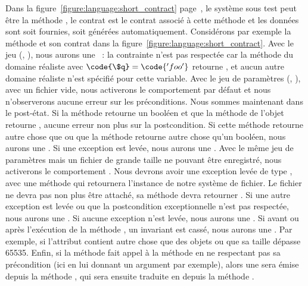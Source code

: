 \begin{example}

Dans la figure~\ref{figure:language:short_contract}
page~\pageref{figure:language:short_contract}, le système sous test peut être la
méthode , le contrat est le contrat associé à cette méthode et les
données sont soit fournies, soit générées automatiquement.  Considérons par
exemple la méthode  et son contrat dans la
figure~\ref{figure:language:short_contract}.
%
Avec le jeu (, ), nous aurons une ~: la contrainte  n'est pas respectée car la
méthode  du domaine réaliste  avec $\code{\$q}
= \code{'foo'}$ retourne , et aucun autre domaine réaliste n'est
spécifié pour cette variable.
%
Avec le jeu de paramètres (, ), avec un fichier
vide, nous activerons le comportement par défaut et nous n'observerons aucune
erreur sur les préconditions. Nous sommes maintenant dans le post-état. Si la
méthode  retourne un booléen et que la méthode  de
l'objet  retourne , aucune erreur non plus sur la
postcondition.  Si cette méthode retourne autre chose que  ou que la
méthode  retourne autre chose qu'un booléen, nous aurons une
. Si une exception est levée, nous aurons une
.
%
Avec le même jeu de paramètres mais un fichier de grande taille ne pouvant être
enregistré, nous activerons le comportement . Nous devrons avoir une
exception levée de type , avec une méthode
 qui retournera l'instance de notre système de fichier. Le
fichier ne devra pas non plus être attaché, \ie sa méthode 
devra retourner . Si une autre exception est levée ou que la
postcondition exceptionnelle n'est pas respectée, nous aurons une
. Si aucune exception n'est levée, nous aurons une
.
%
Si avant ou après l'exécution de la méthode , un invariant est
cassé, nous aurons une . Par exemple, si l'attribut
 contient autre chose que des objets  ou que sa taille
dépasse 65535.
%
Enfin, si la méthode  fait appel à la méthode  en ne
respectant pas sa précondition (ici en lui donnant un argument par exemple),
alors une  sera émise depuis la méthode
, qui sera ensuite traduite en  depuis la méthode .

\end{example}

